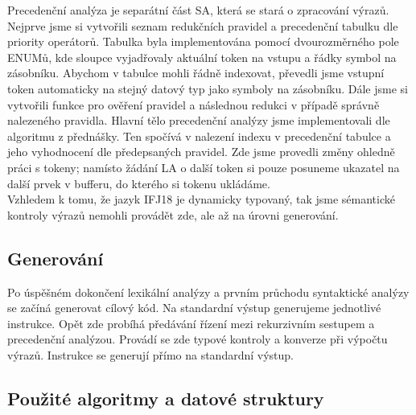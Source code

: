 \documentclass[a4paper, 12pt]{article}
\begin{document}
Precedenční analýza je separátní část SA, která se stará o zpracování výrazů. Nejprve jsme si vytvořili seznam redukčních pravidel a precedenční tabulku dle priority operátorů. Tabulka byla implementována pomocí dvourozměrného pole ENUMů, kde sloupce vyjadřovaly aktuální token na vstupu a řádky symbol na zásobníku. Abychom v tabulce mohli řádně indexovat, převedli jsme vstupní token automaticky na stejný datový typ jako symboly na zásobníku. Dále jsme si vytvořili funkce pro ověření pravidel a následnou redukci v případě správně nalezeného pravidla. Hlavní tělo precedenční analýzy jsme implementovali dle algoritmu z přednášky. Ten spočívá v nalezení indexu v precedenční tabulce a jeho vyhodnocení dle předepsaných pravidel. Zde jsme provedli změny ohledně práci s tokeny; namísto žádání LA o další token si pouze posuneme ukazatel na další prvek v bufferu, do kterého si tokenu ukládáme. \\
Vzhledem k tomu, že jazyk IFJ18 je dynamicky typovaný, tak jsme sémantické kontroly výrazů nemohli provádět zde, ale až na úrovni generování.

\subsection{Generování} \label{gener}

Po úspěšném dokončení lexikální analýzy a prvním průchodu syntaktické analýzy se začíná generovat cílový kód. Na standardní výstup generujeme jednotlivé instrukce. Opět zde probíhá předávání řízení mezi rekurzivním sestupem a precedenční analýzou. Provádí se zde typové kontroly a konverze při výpočtu výrazů. Instrukce se generují přímo na standardní výstup.  





\newpage

\subsection{Použité algoritmy a datové struktury}
\end{document}
